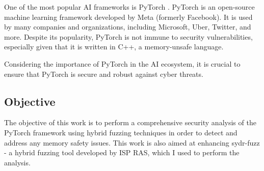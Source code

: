 One of the most popular AI frameworks is PyTorch \cite{pytorch}. PyTorch is an open-source machine learning framework developed by Meta (formerly Facebook). It is used by many companies and organizations, including Microsoft, Uber, Twitter, and more. Despite its popularity, PyTorch is not immune to security vulnerabilities, especially given that it is written in C++, a memory-unsafe language.

Considering the importance of PyTorch in the AI ecosystem, it is crucial to ensure that PyTorch is secure and robust against cyber threats.

\subsection{Objective}

The objective of this work is to perform a comprehensive security analysis of the PyTorch framework using hybrid fuzzing techniques in order to detect and address any memory safety issues. This work is also aimed at enhancing sydr-fuzz \cite{sydr-cutting-edge-dynamic-symbolic-execution} - a hybrid fuzzing tool developed by ISP RAS, which I used to perform the analysis.
